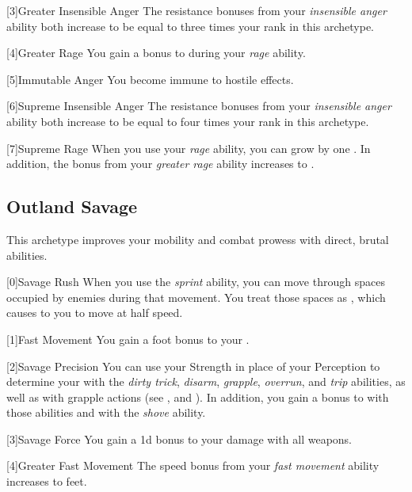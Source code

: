         [3]{Greater Insensible Anger} The resistance bonuses from your \textit{insensible anger} ability both increase to be equal to three times your rank in this archetype.

        [4]{Greater Rage} You gain a  bonus to  during your \textit{rage} ability.

        [5]{Immutable Anger} You become immune to hostile  effects.

        [6]{Supreme Insensible Anger} The resistance bonuses from your \textit{insensible anger} ability both increase to be equal to four times your rank in this archetype.

        [7]{Supreme Rage} When you use your \textit{rage} ability, you can grow by one .
        In addition, the  bonus from your \textit{greater rage} ability increases to .

    \newpage
    \subsection{Outland Savage}
        This archetype improves your mobility and combat prowess with direct, brutal abilities.

        [0]{Savage Rush} When you use the \textit{sprint} ability, you can move through spaces occupied by enemies during that movement.
        You treat those spaces as , which causes to you to move at half speed.

        [1]{Fast Movement} You gain a  foot bonus to your .

        [2]{Savage Precision} You can use your Strength in place of your Perception to determine your  with the \textit{dirty trick}, \textit{disarm}, \textit{grapple}, \textit{overrun}, and \textit{trip} abilities, as well as with grapple actions (see , and ).
        In addition, you gain a  bonus to  with those abilities and with the \textit{shove} ability.

        [3]{Savage Force} You gain a \plus1d bonus to your damage with all weapons.

        [4]{Greater Fast Movement} The speed bonus from your \textit{fast movement} ability increases to  feet.

